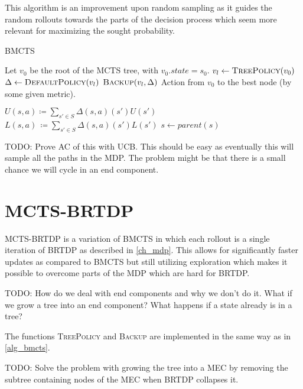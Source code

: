 This algorithm is an improvement upon random sampling as it guides the
random rollouts towards the parts of the decision process which seem
more relevant for maximizing the sought probability.

\begin{algorithm}
\caption{BMCTS}
\label{alg_bmcts}
\begin{algorithmic}
    \State Let $v_0$ be the root of the MCTS tree, with $v_0.state = s_0$.
        \State $v_l \gets \Call{TreePolicy}{v_0}$
        \State $\Delta \gets \Call{DefaultPolicy}{v_l}$
        \State $\Call{Backup}{v_l, \Delta}$
    \EndWhile
    \State \Return Action from $v_0$ to the best node (by some
    given metric).
\EndFunction

\EndFunction

\Repeat
{}
\EndFunction

\Repeat
    \State $U(s,a) \coloneqq \sum_{s' \in S} \Delta(s,a)(s')U(s')$
    \State $L(s,a)\, \coloneqq \sum_{s' \in S} \Delta(s,a)(s')L(s')$
    \State $s \gets parent(s)$
\EndFunction
\end{algorithmic}
\end{algorithm}


TODO: Prove AC of this with UCB. This should be easy as eventually this will sample all
the paths in the MDP. The problem might be that there is a small chance
we will cycle in an end component.


\section{MCTS-BRTDP}

MCTS-BRTDP is a variation of BMCTS in which each rollout is a
single iteration of BRTDP as described in \autoref{ch_mdp}. This allows
for significantly faster updates as compared to BMCTS but still
utilizing exploration which makes it possible to overcome parts of the
MDP which are hard for BRTDP.

TODO: How do we deal with end components and why we don't do it. What if
we grow a tree into an end component? What happens if a state already is
in a tree?

The functions \textsc{TreePolicy} and \textsc{Backup} are implemented in
the same way as in \autoref{alg_bmcts}.

TODO: Solve the problem with growing the tree into a MEC by removing the
subtree containing nodes of the MEC when BRTDP collapses it.

